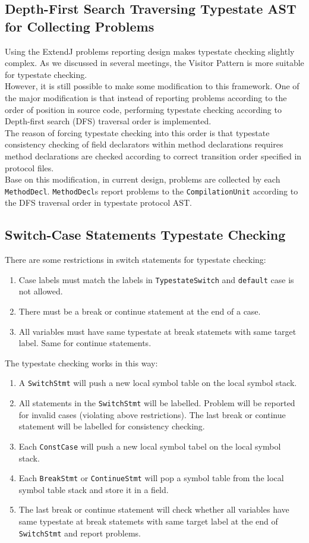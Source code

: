 \documentclass[]{article}
\begin{document}
\subsection{Depth-First Search Traversing Typestate AST for Collecting Problems}
Using the ExtendJ problems reporting design makes typestate checking slightly complex. As we discussed in several meetings, the Visitor Pattern is more suitable for typestate checking. \\[0.2cm]
However, it is still possible to make some modification to this framework. One of the major modification is that instead of reporting problems according to the order of position in source code, performing typestate checking according to Depth-first search (DFS) traversal order is implemented. \\[0.2cm]
The reason of forcing typestate checking into this order is that typestate consistency checking of field declarators within method declarations requires method declarations are checked according to correct transition order specified in protocol files. \\[0.2cm]
Base on this modification, in current design, problems are collected by each \texttt{MethodDecl}. \texttt{MethodDecl}s report problems to the \texttt{CompilationUnit} according to the DFS traversal order in typestate protocol AST. 

\subsection{Switch-Case Statements Typestate Checking}
There are some restrictions in switch statements for typestate checking:
\begin{enumerate}
	\item Case labels must match the labels in \texttt{TypestateSwitch} and \texttt{default} case is not allowed.
	\item There must be a break or continue statement at the end of a case.
	\item All variables must have same typestate at break statemets with same target label. Same for continue statements.
\end{enumerate}
The typestate checking works in this way:
\begin{enumerate}
	\item A \texttt{SwitchStmt} will push a new local symbol table on the local symbol stack.
	\item All statements in the \texttt{SwitchStmt} will be labelled. Problem will be reported for invalid cases (violating above restrictions). The last break or continue statement will be labelled for consistency checking.
	\item Each \texttt{ConstCase} will push a new local symbol tabel on the local symbol stack.
	\item Each \texttt{BreakStmt} or \texttt{ContinueStmt} will pop a symbol table from the local symbol table stack and store it in a field.
	\item The last break or continue statement will check whether all variables have same typestate at break statemets with same target label at the end of \texttt{SwitchStmt} and report problems.
\end{enumerate}
\end{document}

